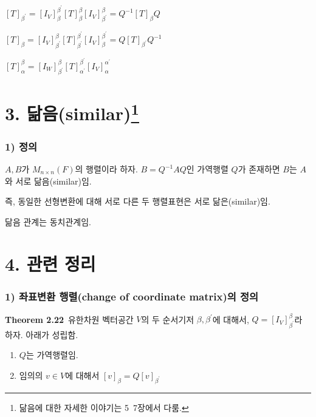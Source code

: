 \begin{center}
$[T]_{\beta^{\prime}}=[I_V]_{\beta}^{\beta^\prime}[T]^{\beta}_{\beta}[I_V]_{\beta^{\prime}}^{\beta}=Q^{-1}[T]_{\beta}Q$
\end{center}

\begin{center}
$[T]_{\beta}=[I_V]^{\beta}_{\beta^\prime}[T]^{\beta^{\prime}}_{\beta^{\prime}}[I_V]^{\beta^{\prime}}_{\beta}=Q[T]_{\beta^{\prime}}Q^{-1}$    
\end{center}

\begin{center}
$[T]_{\alpha}^{\beta}=[I_W]_{\beta^\prime}^{\beta}[T]_{\alpha^{\prime}}^{\beta^{\prime}}[I_V]_{\alpha}^{\alpha^{\prime}}$\\
\end{center}


\section*{3. 닮음(similar)\footnote{닮음에 대한 자세한 이야기는 5~7장에서 다룸.}}
\subsubsection*{1) 정의\\}
\begin{DEF}
$A,B$가 $M_{n \times n}(F)$의 행렬이라 하자. $B=Q^{-1}AQ$인 가역행렬 $Q$가 존재하면 $B$는 $A$와 서로 닮음(similar)임.
\end{DEF}

즉, 동일한 선형변환에 대해 서로 다른 두 행렬표현은 서로 닮은(similar)임.

닮음 관계는 동치관계임.


\newpage


\section*{4. 관련 정리}
\subsubsection*{1) 좌표변환 행렬(change of coordinate matrix)의 정의}
\textbf{Theorem 2.22}\, 유한차원 벡터공간 $V$의 두 순서기저 $\beta, \beta^{\prime}$에 대해서, $Q=[I_V]^{\beta}_{\beta^{\prime}}$라 하자. 아래가 성립함.

\begin{enumerate}
    \item $Q$는 가역행렬임.
    \item 임의의 $v \in V$에 대해서 $[v]_{\beta}=Q[v]_{\beta^{\prime}}$
\end{enumerate}

